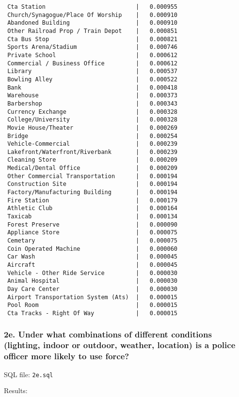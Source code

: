 \documentclass[10pt]{article}
\begin{document}
\begin{verbatim}
 Cta Station                          |   0.000955
 Church/Synagogue/Place Of Worship    |   0.000910
 Abandoned Building                   |   0.000910
 Other Railroad Prop / Train Depot    |   0.000851
 Cta Bus Stop                         |   0.000821
 Sports Arena/Stadium                 |   0.000746
 Private School                       |   0.000612
 Commercial / Business Office         |   0.000612
 Library                              |   0.000537
 Bowling Alley                        |   0.000522
 Bank                                 |   0.000418
 Warehouse                            |   0.000373
 Barbershop                           |   0.000343
 Currency Exchange                    |   0.000328
 College/University                   |   0.000328
 Movie House/Theater                  |   0.000269
 Bridge                               |   0.000254
 Vehicle-Commercial                   |   0.000239
 Lakefront/Waterfront/Riverbank       |   0.000239
 Cleaning Store                       |   0.000209
 Medical/Dental Office                |   0.000209
 Other Commercial Transportation      |   0.000194
 Construction Site                    |   0.000194
 Factory/Manufacturing Building       |   0.000194
 Fire Station                         |   0.000179
 Athletic Club                        |   0.000164
 Taxicab                              |   0.000134
 Forest Preserve                      |   0.000090
 Appliance Store                      |   0.000075
 Cemetary                             |   0.000075
 Coin Operated Machine                |   0.000060
 Car Wash                             |   0.000045
 Aircraft                             |   0.000045
 Vehicle - Other Ride Service         |   0.000030
 Animal Hospital                      |   0.000030
 Day Care Center                      |   0.000030
 Airport Transportation System (Ats)  |   0.000015
 Pool Room                            |   0.000015
 Cta Tracks - Right Of Way            |   0.000015
\end{verbatim}

\subsubsection*{2e. Under what combinations of different conditions (lighting, indoor or outdoor, weather, location) is a police officer more likely to use force?}

SQL file: \texttt{2e.sql}

Results:
\end{document}
